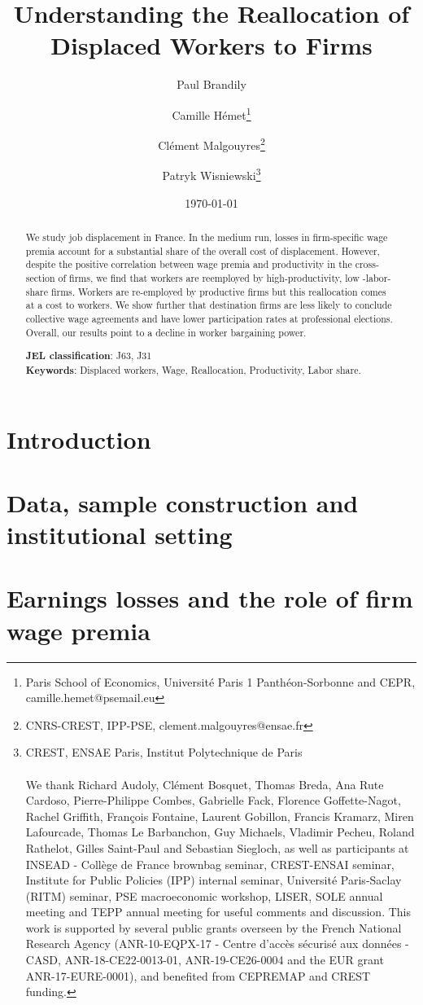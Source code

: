 \documentclass[12pt,french,american,a4paper]{article}
\title{\textbf{Understanding the Reallocation of Displaced Workers to Firms}}
\author{Paul Brandily%
\and Camille Hémet\thanks{Paris School of Economics, Université Paris 1 Panthéon-Sorbonne and CEPR, \protect \\
camille.hemet@psemail.eu} \and 
Clément Malgouyres\thanks{CNRS-CREST, IPP-PSE, clement.malgouyres@ensae.fr} \and Patryk Wisniewski\thanks{CREST, ENSAE Paris, Institut Polytechnique de Paris \protect \\ 
\protect \\ 
We thank Richard Audoly, Clément Bosquet, Thomas Breda, Ana Rute Cardoso, Pierre-Philippe Combes, Gabrielle Fack, Florence Goffette-Nagot, Rachel Griffith, François Fontaine, Laurent Gobillon, Francis Kramarz, Miren Lafourcade, Thomas Le Barbanchon, Guy Michaels, Vladimir Pecheu, Roland Rathelot, Gilles Saint-Paul and Sebastian Siegloch, as well as participants at INSEAD - Collège de France brownbag seminar, CREST-ENSAI seminar, Institute for Public Policies (IPP) internal seminar, Université Paris-Saclay (RITM) seminar, PSE macroeconomic workshop, LISER, SOLE annual meeting and TEPP annual meeting for useful comments and discussion. This work is supported by several public grants overseen by the French National Research Agency (ANR-10-EQPX-17 - Centre d'accès sécurisé aux données - CASD, ANR-18-CE22-0013-01, ANR-19-CE26-0004 and the EUR grant ANR-17-EURE-0001), and benefited from CEPREMAP and CREST funding.}}
\date{\today}
\begin{document}
\maketitle




\begin{abstract}\singlespacing
We study job displacement in France. In the medium run, losses in firm-specific wage premia account for a substantial share of the overall cost of displacement. However, despite the positive correlation between wage premia and productivity in the cross-section of firms, we find that workers are reemployed by high-productivity, low -labor-share firms. Workers are re-employed by productive firms but this reallocation comes at a cost to workers. We show further that destination firms are less likely to conclude collective wage agreements and have lower participation rates at professional elections. Overall, our results point to a decline in worker bargaining power.

	
	\noindent \textbf{JEL classification}: J63, J31 \\ %
	\noindent \textbf{Keywords}: Displaced workers, Wage, Reallocation, Productivity, Labor share.
\end{abstract}



\newpage
\section{Introduction}


\FloatBarrier
\section{Data, sample construction and institutional setting} \label{sec:Data} 

\FloatBarrier

\section{Earnings losses and the role of firm wage premia} \label{sec:FEtheory}



\FloatBarrier
\end{document}
